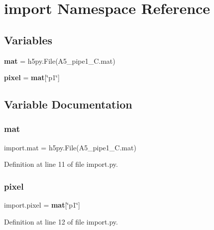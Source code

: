 \section{import Namespace Reference}
\label{namespaceimport}
\subsection*{Variables}
\begin{DoxyCompactItemize}
\item 
\textbf{ mat} = h5py.\+File(\textquotesingle{}A5\+\_\+pipe1\+\_\+C.\+mat\textquotesingle{})
\item 
\textbf{ pixel} = \textbf{ mat}[\char`\"{}p1\char`\"{}]
\end{DoxyCompactItemize}


\subsection{Variable Documentation}
\mbox{\label{namespaceimport_a8834910c11d2bd4aa11ac7952d06655a}} 
\subsubsection{mat}
{\footnotesize\ttfamily import.\+mat = h5py.\+File(\textquotesingle{}A5\+\_\+pipe1\+\_\+C.\+mat\textquotesingle{})}



Definition at line 11 of file import.\+py.

\mbox{\label{namespaceimport_aba39f75ac78ef81c39d2908060697c7a}} 
\subsubsection{pixel}
{\footnotesize\ttfamily import.\+pixel = \textbf{ mat}[\char`\"{}p1\char`\"{}]}



Definition at line 12 of file import.\+py.

